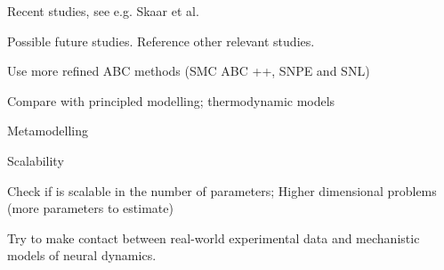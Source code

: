 Recent studies, see e.g. Skaar et al. 


Possible future studies. Reference other relevant studies. 

Use more refined ABC methods
(SMC ABC ++, SNPE and SNL)

Compare with principled modelling; thermodynamic models

Metamodelling

Scalability 

Check if is scalable in the number of parameters;
Higher dimensional problems (more parameters to estimate)

Try to make contact between real-world experimental data and mechanistic models of neural dynamics. 
